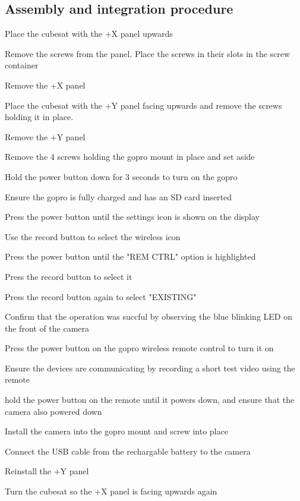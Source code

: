 \newpage
\subsection{Assembly and integration procedure}
\begin{checklist}
    \item Place the cubesat with the +X panel upwards
    \item Remove the screws from the panel. Place the screws in their slots in the screw container
    \item Remove the +X panel
    \item Place the cubesat with the +Y panel facing upwards and remove the screws holding it in place.
	\item Remove the +Y panel
	\item Remove the 4 screws holding the gopro mount in place and set aside
	\item Hold the power button down for 3 seconds to turn on the gopro
	\item Ensure the gopro is fully charged and has an SD card inserted
	\item Press the power button until the settings icon is shown on the display
	\item Use the record button to select the wireless icon
	\item Press the power button until the "REM CTRL" option is highlighted
	\item Press the record button to select it
	\item Press the record button again to select "EXISTING"
	\item Confirm that the operation was succful by observing the blue blinking LED on the front of the camera
	\item Press the power button on the gopro wireless remote control to turn it on
	\item Ensure the devices are communicating by recording a short test video using the remote
	\item hold the power button on the remote until it powers down, and ensure that the camera also powered down
	\item Install the camera into the gopro mount and screw into place
	\item Connect the USB cable from the rechargable battery to the camera
	\item Reinstall the +Y panel
	\item Turn the cubesat so the +X panel is facing upwards again

\end{checklist}
